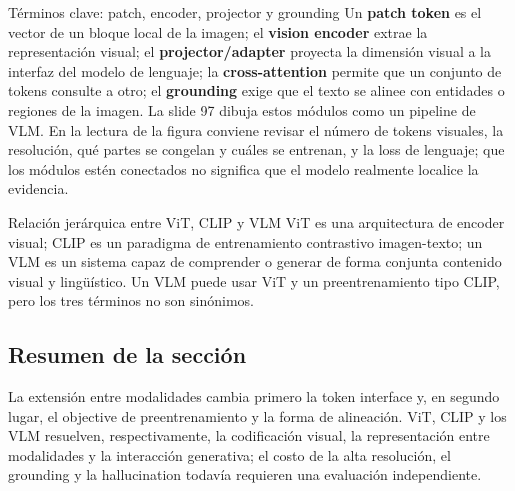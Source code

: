 


\begin{knowledgebox}{Términos clave: patch, encoder, projector y grounding}
Un \textbf{patch token} es el vector de un bloque local de la imagen; el \textbf{vision encoder} extrae la representación visual; el \textbf{projector/adapter} proyecta la dimensión visual a la interfaz del modelo de lenguaje; la \textbf{cross-attention} permite que un conjunto de tokens consulte a otro; el \textbf{grounding} exige que el texto se alinee con entidades o regiones de la imagen. La slide 97 dibuja estos módulos como un pipeline de VLM. En la lectura de la figura conviene revisar el número de tokens visuales, la resolución, qué partes se congelan y cuáles se entrenan, y la loss de lenguaje; que los módulos estén conectados no significa que el modelo realmente localice la evidencia.
\end{knowledgebox}

\begin{knowledgebox}{Relación jerárquica entre ViT, CLIP y VLM}
ViT es una arquitectura de encoder visual; CLIP es un paradigma de entrenamiento contrastivo imagen-texto; un VLM es un sistema capaz de comprender o generar de forma conjunta contenido visual y lingüístico. Un VLM puede usar ViT y un preentrenamiento tipo CLIP, pero los tres términos no son sinónimos.
\end{knowledgebox}

\subsection{Resumen de la sección}

La extensión entre modalidades cambia primero la token interface y, en segundo lugar, el objective de preentrenamiento y la forma de alineación. ViT, CLIP y los VLM resuelven, respectivamente, la codificación visual, la representación entre modalidades y la interacción generativa; el costo de la alta resolución, el grounding y la hallucination todavía requieren una evaluación independiente.
